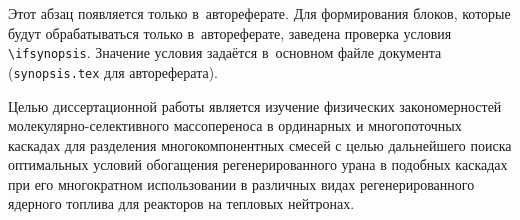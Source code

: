 \ifsynopsis
Этот абзац появляется только в~автореферате.
Для формирования блоков, которые будут обрабатываться только в~автореферате,
заведена проверка условия \verb!\!\verb!ifsynopsis!.
Значение условия задаётся в~основном файле документа (\verb!synopsis.tex! для
автореферата).
\else
\fi


{\aim} Целью диссертационной работы является изучение физических закономерностей
молекулярно-селективного массопереноса в ординарных и многопоточных каскадах
для разделения многокомпонентных смесей с целью дальнейшего поиска
оптимальных условий обогащения регенерированного урана в подобных каскадах при
его многократном использовании в различных видах регенерированного ядерного
топлива для реакторов на тепловых нейтронах.


